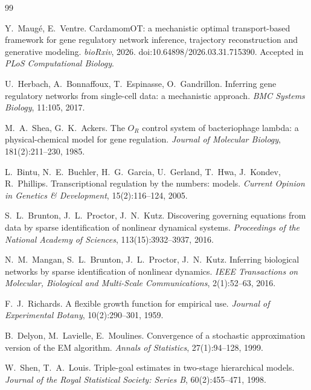 \documentclass[a4paper, 11pt]{article}
\theoremstyle{plain}
\theoremstyle{remark}
\begin{document}
\begin{thebibliography}{99}

Y.~Maugé, E.~Ventre.
\newblock CardamomOT: a mechanistic optimal transport-based framework for gene regulatory network inference, trajectory reconstruction and generative modeling.
\newblock \emph{bioRxiv}, 2026. doi:10.64898/2026.03.31.715390. Accepted in \emph{PLoS Computational Biology}.

U.~Herbach, A.~Bonnaffoux, T.~Espinasse, O.~Gandrillon.
\newblock Inferring gene regulatory networks from single-cell data: a mechanistic approach.
\newblock \emph{BMC Systems Biology}, 11:105, 2017.

M.~A.~Shea, G.~K.~Ackers.
\newblock The $O_R$ control system of bacteriophage lambda: a physical-chemical model for gene regulation.
\newblock \emph{Journal of Molecular Biology}, 181(2):211--230, 1985.

L.~Bintu, N.~E.~Buchler, H.~G.~Garcia, U.~Gerland, T.~Hwa, J.~Kondev, R.~Phillips.
\newblock Transcriptional regulation by the numbers: models.
\newblock \emph{Current Opinion in Genetics \& Development}, 15(2):116--124, 2005.

S.~L.~Brunton, J.~L.~Proctor, J.~N.~Kutz.
\newblock Discovering governing equations from data by sparse identification of nonlinear dynamical systems.
\newblock \emph{Proceedings of the National Academy of Sciences}, 113(15):3932--3937, 2016.

N.~M.~Mangan, S.~L.~Brunton, J.~L.~Proctor, J.~N.~Kutz.
\newblock Inferring biological networks by sparse identification of nonlinear dynamics.
\newblock \emph{IEEE Transactions on Molecular, Biological and Multi-Scale Communications}, 2(1):52--63, 2016.

F.~J.~Richards.
\newblock A flexible growth function for empirical use.
\newblock \emph{Journal of Experimental Botany}, 10(2):290--301, 1959.

B.~Delyon, M.~Lavielle, E.~Moulines.
\newblock Convergence of a stochastic approximation version of the EM algorithm.
\newblock \emph{Annals of Statistics}, 27(1):94--128, 1999.

W.~Shen, T.~A.~Louis.
\newblock Triple-goal estimates in two-stage hierarchical models.
\newblock \emph{Journal of the Royal Statistical Society: Series B}, 60(2):455--471, 1998.

\end{thebibliography}
\end{document}
